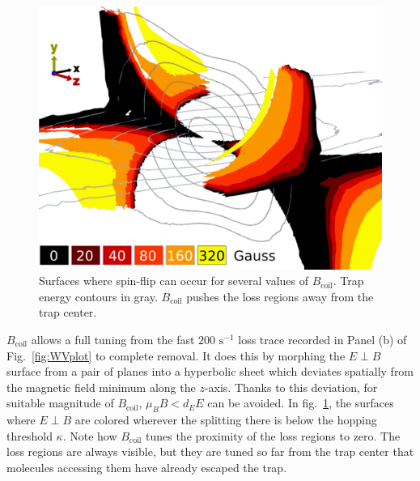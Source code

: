 \documentclass[%
 reprint,
groupedaddress,
 amsmath,amssymb,
 aps,
prl,
]{revtex4-1}
\newcommand{\epb}{$E\!\perp\!B$}
\begin{document}
\begin{figure}[tb]
\includegraphics[width=\linewidth]{LossSurfaces/Loss_Surface_Chunks_recolored_heat_legend.png}%
\caption{
Surfaces where spin-flip can occur for several values of $B_\text{coil}$. Trap energy contours in gray. $B_\text{coil}$ pushes the loss regions away from the trap center.
\label{fig:LSurfs}}
\end{figure}

$B_\text{coil}$ allows a full tuning from the fast $200\text{ s}^{-1}$ loss trace recorded in Panel (b) of Fig.~\ref{fig:WVplot} to complete removal. It does this by morphing the \epb{} surface from a pair of planes into a hyperbolic sheet which deviates spatially from the magnetic field minimum along the $z$-axis. Thanks to this deviation, for suitable magnitude of $B_\text{coil}$, $\mu_BB< d_EE$ can be avoided. In fig.~\ref{fig:LSurfs}, the surfaces where \epb{} are colored wherever the splitting there is below the hopping threshold $\kappa$. Note how $B_\text{coil}$ tunes the proximity of the loss regions to zero. The loss regions are always visible, but they are tuned so far from the trap center that molecules accessing them have already escaped the trap.
\end{document}
